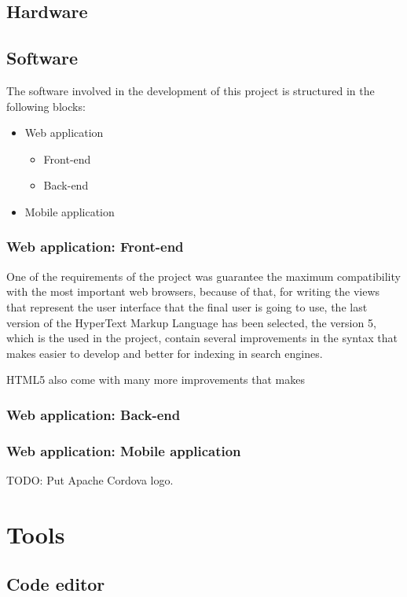 \documentclass{DeustoFDP}
\begin{document}
\subsection{Hardware}
\subsection{Software}
The software involved in the development of this project is structured in the following blocks:
\begin{itemize}
	\item Web application
	\begin{itemize}
		\item Front-end
		\item Back-end
	\end{itemize}
	\item Mobile application
\end{itemize}

\subsubsection{Web application: Front-end}
One of the requirements of the project was guarantee the maximum compatibility with the most important web browsers, because of that, for writing the views that represent the user interface that the final user is going to use, the last version of the HyperText Markup Language has been selected, the version 5, which is the used in the project, contain several improvements in the syntax that makes easier to develop and better for indexing in search engines.

HTML5 also come with many more improvements that makes 

\subsubsection{Web application: Back-end}
\subsubsection{Web application: Mobile application}
TODO: Put Apache Cordova logo.
\section{Tools}
\subsection{Code editor}
\end{document}

